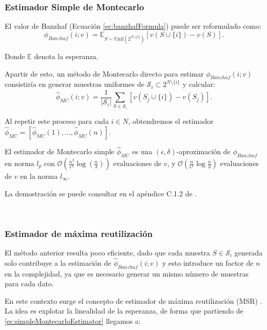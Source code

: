 \subsubsection*{Estimador Simple de Montecarlo}
El valor de Banzhaf (Ecuación \ref{ec:banzhafFormula})
puede ser reformulado como:
\begin{equation*}
  \label{simpleMontecarlo}
  \phi_{Banzhaf}(i;v) = \mathbb{E}_{S \sim \text{Unif}
  (2^{N\setminus \{i\}})} [v(S \cup \{i\})-v(S)].
\end{equation*}

Donde $\mathbb{E}$  denota la esperanza.

Apartir de esto, un método de Montecarlo directo para estimar
$\phi_{Banzhaf}(i;v)$ consistiría
en generar muestras uniformes de $\mathcal{S}_i
\subset 2^{N \setminus \{i\}}$ y calcular:
\begin{equation}
  \label{ec:simpleMontecarloEstimator}
  \hat{\phi}_{MC}(i;v) = \frac{1}{|\mathcal{S}_i|}\sum_{S \in
  \mathcal{S}_i} [v(S_j \cup \{i\})-v(S_j)].
\end{equation}

Al repetir este proceso para cada $i \in N$, obtendremos
el estimador $\hat{\phi}_{MC} = [\hat{\phi}_{MC}(1),\dots,
\hat{\phi}_{MC}(n)]$. 


\begin{theorem}
  El estimador de Montecarlo simple $\hat{\phi}_{MC}$
  es una $(\epsilon,\delta)$-aproximación de $\phi_{Banzhaf}$
  en norma $l_p$ con $\mathcal{O}(\frac{n^2}{\epsilon^2}
  \log(\frac{n}{\delta}))$ evaluaciones de $v$, y
  $\mathcal{O}(\frac{n}{\epsilon^2}
  \log{\frac{n}{\delta}})$ evaluaciones de $v$ en la norma
  $l_{\infty}$.
\end{theorem}

La demostración se puede consultar en el apéndice
C.1.2 de \cite{dataBanzhaf}.

\

\subsubsection*{Estimador de máxima reutilización}

El método anterior resulta poco eficiente,
dado que cada muestra $S \in \mathcal{S}_i$ generada
solo contribuye a la estimación de
$\hat{\phi}_{Banzhaf}(i;v)$ y esto introduce un
factor de $n$ en la complejidad, ya que es necesario
generar un mismo número de muestras para cada dato.

En este contexto surge el concepto de estimador de máxima
reutilización (MSR)  \cite{dataBanzhaf}.
La idea es explotar la linealidad de la esperanza, de forma que
partiendo de \ref{ec:simpleMontecarloEstimator} llegamos a:

